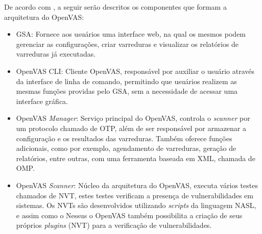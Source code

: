 De acordo com , a seguir serão descritos os componentes que formam a arquitetura do \gls{OpenVAS}:
\begin{itemize}
    \item \gls{GSA}: Fornece aos usuários uma interface web, na qual os mesmos podem gerenciar as configurações, criar varreduras e visualizar os relatórios de varreduras já executadas.
    \item \gls{OpenVAS} CLI: Cliente \gls{OpenVAS}, responsável por auxiliar o usuário através da interface de linha de comando, permitindo que usuários realizem as mesmas funções providas pelo \gls{GSA}, sem a necessidade de acessar uma interface gráfica.
    \item \gls{OpenVAS} \textit{Manager}: Serviço principal do \gls{OpenVAS}, controla o \textit{scanner} por um protocolo chamado de \gls{OTP}, além de ser responsável por armazenar a configuração e os resultados das varreduras. Também oferece funções adicionais, como por exemplo, agendamento de varreduras, geração de relatórios, entre outras, com uma ferramenta baseada em \gls{XML}, chamada de \gls{OMP}.
    \item \gls{OpenVAS} \textit{Scanner}: Núcleo da arquitetura do \gls{OpenVAS}, executa vários testes chamados de \gls{NVT}, estes testes verificam a presença de vulnerabilidades em sistemas. Os \gls{NVT}s são desenvolvidos utilizando \textit{scripts} da linguagem \gls{NASL}, e assim como o Nessus o \gls{OpenVAS} também possibilita a criação de seus próprios \textit{plugins} (\gls{NVT}) para a verificação de vulnerabilidades.
\end{itemize}

